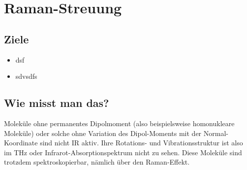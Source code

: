 
\chapter{Raman-Streuung}



% 


\section{Ziele}

\begin{itemize}
\item dsf

\item sdvsdfs

\end{itemize}

\section{Wie misst man das?}

Moleküle ohne permanentes Dipolmoment (also beispielsweise homonukleare Moleküle) oder solche ohne Variation des Dipol-Moments mit der Normal-Koordinate sind nicht IR aktiv. Ihre Rotations- und Vibrationsstruktur ist also im THz oder Infrarot-Absorptionspektrum nicht zu sehen. Diese Moleküle sind trotzdem spektroskopierbar, nämlich über den Raman-Effekt.

